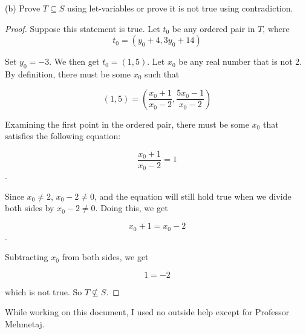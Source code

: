 \documentclass[12pt]{article}
\begin{document}
\newpage
(b) %
Prove $T \subseteq S$ using let-variables or prove it is not true using contradiction.

\begin{proof}
    Suppose this statement is true. Let $t_{0}$ be any ordered pair in $T$, where $$ t_{0} = \left( y_{0} + 4, 3y_{0} + 14 \right)$$

    Set $y_{0} = -3$. We then get $ t_{0} = \left( 1, 5 \right) $. Let $x_0$ be any real number that is not 2. By definition, there must be some $x_0$ such that 

    $$(1, 5) = \left( \frac{x_{0} + 1}{x_{0} - 2}, \frac{5x_{0} - 1}{x_{0} - 2} \right) $$
    
    
    Examining the first point in the ordered pair, there must be some $x_0$ that satisfies the following equation:

    $$ \frac{x_0 + 1}{x_0 - 2} = 1 $$.

    Since $x_0 \neq 2$, $x_0 - 2 \neq 0$, and the equation will still hold true when we divide both sides by $x_0 - 2 \neq 0$. Doing this, we get

    $$x_0 + 1 = x_0 - 2$$.

    Subtracting $x_0$ from both sides, we get

    $$1 = -2$$

    which is not true. So $T \not\subseteq S$.
    
    
\end{proof}

While working on this document, I used no outside help except for Professor Mehmetaj.
 
\end{document}
